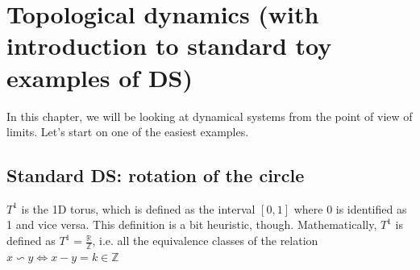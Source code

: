 \chapter{Topological dynamics (with introduction to standard toy examples of DS)}
In this chapter, we will be looking at dynamical systems from the point of view of limits. Let's start on one of the easiest examples.

\section{Standard DS: rotation of the circle}

\begin{definition}
    $T^1$ is the 1D torus, which is defined as the interval $[0,1]$ where 0 is identified as 1 and vice versa. This definition is a bit heuristic, though. Mathematically, $T^1$ is defined as $T^1=\frac{\mathbb{R}}{\mathbb{Z}}$, i.e. all the equivalence classes of the relation  $x\backsim y \iff x-y=k\in\mathbb{Z}$ 
\end{definition}

